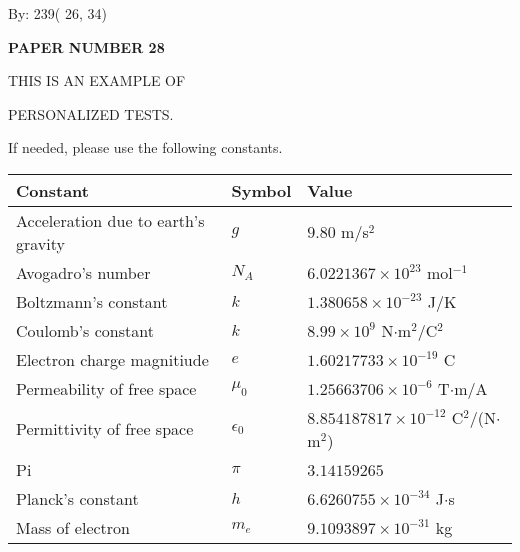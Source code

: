 \documentclass[12pt]{article}
\begin{document}
   
\hspace{1.0in} By: 
         239(         26,          34)
   
   
   
   
\newpage 
\setcounter{page}{ 
    28001 } 
   
   
   
   
 {\textbf{ \Large{ PAPER NUMBER          28 }}}
   
   
\vspace{0.2in}
   
   
   
   
   
   
   
   
 \vspace{0.2in}
 
 
{\Huge  THIS IS AN EXAMPLE OF}
 
{\Huge  PERSONALIZED TESTS. }
 
If needed, please use the following constants.
 
 
 
\noindent\begin{tabular}{|l|l|l|}
\hline
Constant & Symbol & Value \\
\hline
Acceleration due to earth's gravity &
$g$ &
 $ 9.80 $
m/s$^2$ \\
\hline
Avogadro's number &
$N_A$ &
 $ 6.0221367 \times 10^{23} $
mol$^{-1}$ \\
\hline
Boltzmann's constant &
$k$ &
 $ 1.380658 \times 10^{-23} $
J/K \\
\hline
Coulomb's constant &
$k$ &
 $ 8.99 \times 10^{9} $
N$\cdot $m$^2$/C$^2$ \\
\hline
Electron charge magnitiude &
$e$ &
 $ 1.60217733 \times 10^{-19} $
C \\
\hline
Permeability of free space &
$\mu _0$ &
 $ 1.25663706 \times 10^{-6} $
T$\cdot $m/A \\
\hline
Permittivity of free space &
$\epsilon _0$ &
 $ 8.854187817 \times 10^{-12} $
C$^2$/(N$\cdot $m$^2$) \\
\hline
Pi &
$\pi$ &
 $ 3.14159265 $
$ $ \\
\hline
Planck's constant &
$h$ &
 $ 6.6260755 \times 10^{-34} $
J$\cdot $s \\
\hline
Mass of electron &
$m_e$ &
 $ 9.1093897 \times 10^{-31} $
kg \\
\hline
\end{tabular}
 
\end{document}
